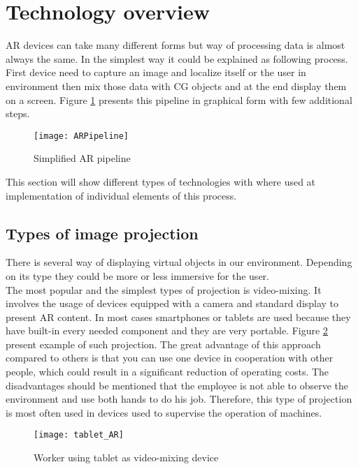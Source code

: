 \documentclass[printmode,en]{mgr}
\begin{document}
\section{Technology overview}
AR devices can take many different forms but way of processing data is almost always the same. In the simplest way it could be explained as following process. First device need to capture an image and localize itself or the user in environment then mix those data with CG objects and at the end display them on a screen. Figure \ref{fig:ARpipeline} presents this pipeline in graphical form with few additional steps.

\begin{figure}[!ht]
  \centering
    \texttt{[image: ARPipeline]}
  \caption{Simplified AR pipeline \cite{Shipyard}}
  \label{fig:ARpipeline}
\end{figure}

This section will show different types of technologies with where used at implementation of individual elements of this process.

\subsection{Types of image projection}
There is several way of displaying virtual objects in our environment. Depending on its type they could be more or less immersive for the user.\\

The most popular and the simplest types of projection is video-mixing. It involves the usage of devices equipped with a camera and standard display to present AR content. In most cases smartphones or tablets are used because they have built-in every needed component and they are very portable. Figure \ref{fig:tabletAR} present example of such projection. The great advantage of this approach compared to others is that you can use one device in cooperation with other people, which could result in a significant reduction of operating costs. The disadvantages should be mentioned that the employee is not able to observe the environment and use both hands to do his job. Therefore, this type of projection is most often used in devices used to supervise the operation of machines.

\begin{figure}[!ht]
  \centering
    \texttt{[image: tablet\_AR]}
  \caption{Worker using tablet as video-mixing device \cite{Shipyard}}
  \label{fig:tabletAR}
\end{figure}
\end{document}
